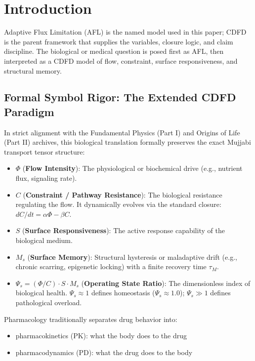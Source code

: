 \documentclass[11pt]{article}
\begin{document}
\section{Introduction}

Adaptive Flux Limitation (AFL) is the named model used in this paper; CDFD is the parent framework that supplies the variables, closure logic, and claim discipline. The biological or medical question is posed first as AFL, then interpreted as a CDFD model of flow, constraint, surface responsiveness, and structural memory.

\subsection{Formal Symbol Rigor: The Extended CDFD Paradigm}
In strict alignment with the Fundamental Physics (Part I) and Origins of Life (Part II) archives, this biological translation formally preserves the exact Mujjabi transport tensor structure:
\begin{itemize}
    \item $\Phi$ (\textbf{Flow Intensity}): The physiological or biochemical drive (e.g., nutrient flux, signaling rate).
    \item $C$ (\textbf{Constraint / Pathway Resistance}): The biological resistance regulating the flow. It dynamically evolves via the standard closure: $dC/dt = \alpha \Phi - \beta C$.
    \item $S$ (\textbf{Surface Responsiveness}): The active response capability of the biological medium.
    \item $M_s$ (\textbf{Surface Memory}): Structural hysteresis or maladaptive drift (e.g., chronic scarring, epigenetic locking) with a finite recovery time $\tau_M$.
    \item $\Psi_s = (\Phi/C) \cdot S \cdot M_s$ (\textbf{Operating State Ratio}): The dimensionless index of biological health. $\Psi_s \approx 1$ defines homeostasis ($\Psi_s \approx 1.0$); $\Psi_s \gg 1$ defines pathological overload.
\end{itemize}


Pharmacology traditionally separates drug behavior into:

\begin{itemize}
    \item pharmacokinetics (PK): what the body does to the drug
    \item pharmacodynamics (PD): what the drug does to the body
\end{itemize}
\end{document}
